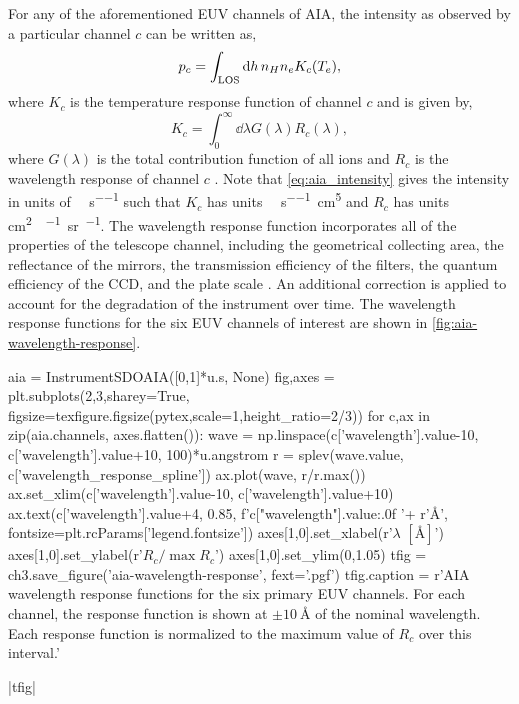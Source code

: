 For any of the aforementioned EUV channels of AIA, the intensity as observed by a particular channel $c$ can be written as,
\begin{equation}\label{eq:aia_intensity}
    p_c = \int_\textup{LOS}\textup{d}h\,n_Hn_eK_c(T_e),
\end{equation}
where $K_c$ is the temperature response function of channel $c$ and is given by,
\begin{equation}\label{eq:temperature_response}
    K_c = \int_0^\infty\dd{\lambda}G(\lambda)R_c(\lambda),
\end{equation}
where $G(\lambda)$ is the total contribution function of all ions and $R_c$ is the wavelength response of channel $c$ \citep{boerner_initial_2012}. Note that \autoref{eq:aia_intensity} gives the intensity in units of \si{\dn\per\pixel\per\second} such that $K_c$ has units \si{\dn\per\pixel\per\second\cm\tothe{5}} and $R_c$ has units \si{\cm\squared\dn\per\photon\steradian\per\pixel}. The wavelength response function incorporates all of the properties of the telescope channel, including the geometrical collecting area, the reflectance of the mirrors, the transmission efficiency of the filters, the quantum efficiency of the CCD, and the plate scale \citep[see Section 2 and Table 2 of][]{boerner_initial_2012}. An additional correction is applied to account for the degradation of the instrument over time. The wavelength response functions for the six EUV channels of interest are shown in \autoref{fig:aia-wavelength-response}.

\begin{pycode}[chapter3]
aia = InstrumentSDOAIA([0,1]*u.s, None)
fig,axes = plt.subplots(2,3,sharey=True,
                        figsize=texfigure.figsize(pytex,scale=1,height_ratio=2/3))
for c,ax in zip(aia.channels, axes.flatten()):
    wave = np.linspace(c['wavelength'].value-10, c['wavelength'].value+10, 100)*u.angstrom
    r = splev(wave.value, c['wavelength_response_spline'])
    ax.plot(wave, r/r.max())
    ax.set_xlim(c['wavelength'].value-10, c['wavelength'].value+10)
    ax.text(c['wavelength'].value+4, 0.85, f'{c["wavelength"].value:.0f} '+ r'$\si{\angstrom}$',
            fontsize=plt.rcParams['legend.fontsize'])
axes[1,0].set_xlabel(r'$\lambda$ $[\si{\angstrom}]$')
axes[1,0].set_ylabel(r'$R_c/\max{R_c}$')
axes[1,0].set_ylim(0,1.05)
tfig = ch3.save_figure('aia-wavelength-response', fext='.pgf')
tfig.caption = r'AIA wavelength response functions for the six primary EUV channels. For each channel, the response function is shown at $\pm\SI{10}{\angstrom}$ of the nominal wavelength. Each response function is normalized to the maximum value of $R_c$ over this interval.'
\end{pycode}
\py[chapter3]|tfig|

